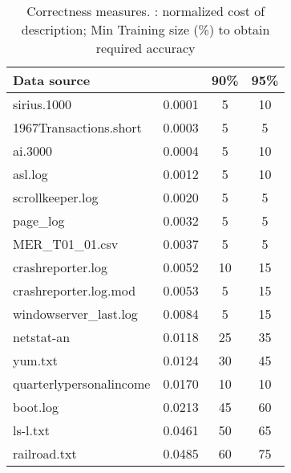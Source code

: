 \begin{table}
\begin{center}
\begin{tabular}{|l||c|c|c|} \hline
Data source	        & \normcostdescription  	& 90\% 		& 95\% \\ \hline \hline
sirius.1000             & 0.0001  	& 5		& 10 \\ \hline
1967Transactions.short	& 0.0003  	& 5		& 5 \\ \hline
ai.3000                 & 0.0004  	& 5		& 10 \\ \hline
asl.log                 & 0.0012  	& 5		& 10\\ \hline
scrollkeeper.log        & 0.0020  	& 5		& 5\\ \hline
page\_log               & 0.0032  	& 5		& 5\\ \hline
MER\_T01\_01.csv        & 0.0037  	& 5		& 5 \\ \hline
crashreporter.log       & 0.0052  	& 10		& 15\\ \hline
crashreporter.log.mod   & 0.0053  	& 5		& 15\\ \hline
windowserver\_last.log  & 0.0084  	& 5		& 15\\ \hline
netstat-an              & 0.0118  	& 25		& 35\\ \hline
yum.txt                 & 0.0124  	& 30		& 45\\ \hline
quarterlypersonalincome & 0.0170  	& 10		& 10\\ \hline
boot.log                & 0.0213  	& 45		& 60\\ \hline
ls-l.txt                & 0.0461  	& 50		& 65 \\ \hline
railroad.txt            & 0.0485  	& 60		& 75\\ \hline
\end{tabular}
\caption{Correctness measures.  \normcostdescription: normalized cost of description;
Min Training size (\%) to obtain required accuracy} \shrink
\label{tab:correlate}
\end{center}
\end{table}



